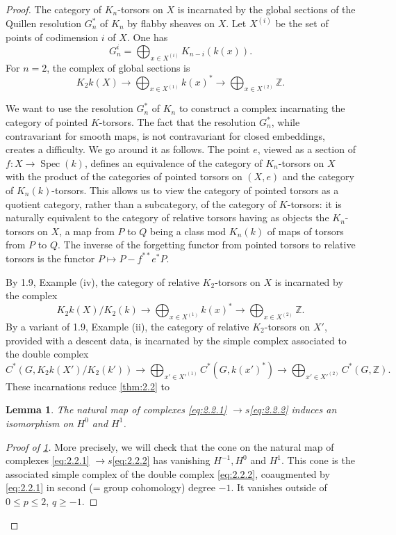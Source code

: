 \documentclass[11pt,a4paper]{article}
\theoremstyle{plain}
\newtheorem{lemma}[theorem]{Lemma}
\theoremstyle{definition}
\DeclareMathOperator{\Spec}{Spec}
\newcommand{\bZ}{\mathbb{Z}}
\begin{document}
\begin{proof}
The category of $K_n$-torsors on $X$ is incarnated by the global sections of the Quillen resolution $G^*_n$ of $K_n$ by flabby sheaves on $X$. Let $X^{(i)}$ be the set of points of codimension $i$ of $X$. One has
\[G^i_n = \bigoplus_{x \in X^{(i)}} K_{n-i}(k(x)).\]
For $n=2$, the complex of global sections is
\[K_2 k(X) \to \bigoplus_{x \in X^{(1)}} k(x)^* \to \bigoplus_{x \in X^{(2)}} \bZ.\]

We want to use the resolution $G^*_n$ of $K_n$ to construct a complex incarnating the category of pointed $K$-torsors. The fact that the resolution $G^*_n$, while contravariant for smooth maps, is not contravariant for closed embeddings, creates a difficulty. We go around it as follows. The point $e$, viewed as a section of $f: X \to \Spec(k)$, defines an equivalence of the category of $K_n$-torsors on $X$ with the product of the categories of pointed torsors on $(X,e)$ and the category of $K_n(k)$-torsors. This allows us to view the category of pointed torsors as a quotient category, rather than a subcategory, of the category of $K$-torsors: it is naturally equivalent to the category of relative torsors having as objects the $K_n$-torsors on $X$, a map from $P$ to $Q$ being a class mod $K_n(k)$ of maps of torsors from $P$ to $Q$. The inverse of the forgetting functor from pointed torsors to relative torsors is the functor $P \mapsto P - f^{**} e^* P$.

By 1.9, Example (iv), the category of relative $K_2$-torsors on $X$ is incarnated by the complex
\begin{equation}\label{eq:2.2.1}
K_2 k(X)/K_2(k) \to \bigoplus_{x \in X^{(1)}} k(x)^* \to \bigoplus_{x \in X^{(2)}} \bZ.
\end{equation}
By a variant of 1.9, Example (ii), the category of relative $K_2$-torsors on $X'$, provided with a descent data, is incarnated by the simple complex associated to the double complex
\begin{equation}\label{eq:2.2.2}
C^*(G, K_2k(X')/K_2(k')) \to \bigoplus_{x' \in X'^{(1)}} C^*(G, k(x')^*) \to \bigoplus_{x' \in X'^{(2)}} C^*(G, \bZ).
\end{equation}
These incarnations reduce \ref{thm:2.2} to
\begin{lemma}\label{lem:2.3}
The natural map of complexes \eqref{eq:2.2.1} $\to s$\eqref{eq:2.2.2} induces an isomorphism on $H^0$ and $H^1$.
\end{lemma}

\begin{proof}[Proof of \ref{lem:2.3}]
More precisely, we will check that the cone on the natural map of complexes \eqref{eq:2.2.1} $\to s$\eqref{eq:2.2.2} has vanishing $H^{-1}, H^0$ and $H^1$. This cone is the associated simple complex of the double complex \eqref{eq:2.2.2}, coaugmented by \eqref{eq:2.2.1} in second (= group cohomology) degree $-1$. It vanishes outside of $0 \leq p \leq 2$, $q \geq -1$.


\end{proof}
\end{proof}
\end{document}
